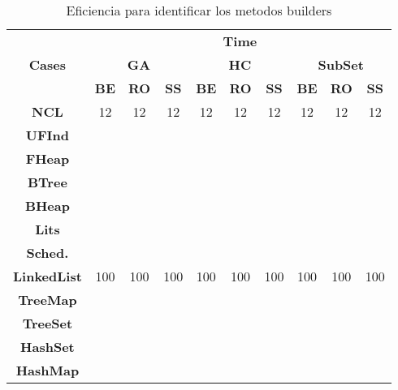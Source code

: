 \begin{table}[t]
\centering
\label{tab:t1}
\scriptsize
\begin{tabular}{|c c|ccc|ccc|ccc|}
\midrule
\multicolumn{2}{|c|}{\multirow{3}{*}{\textbf{Cases}}} & \multicolumn{9}{c|}{\textbf{Time}} \\
\cline{3-11}
\multicolumn{2}{|c|}{} & \multicolumn{3}{c}{\textbf{GA}} & \multicolumn{3}{c}{\textbf{HC}} & \multicolumn{3}{c|}{\textbf{SubSet}} \\
\multicolumn{2}{|c|}{} & \textbf{\tiny{BE}} & \textbf{\tiny{RO}} & \textbf{\tiny{SS}} & \textbf{\tiny{BE}} & \textbf{\tiny{RO}} & \textbf{\tiny{SS}} & \textbf{\tiny{BE}} & \textbf{\tiny{RO}} & \textbf{\tiny{SS}}\\
\midrule
\multicolumn{2}{|c|}{\textbf{NCL}} & 12  & 12  & 12 &  12 &12 &  12&   12& 12  &  12 \\
\midrule
\multicolumn{2}{|c|}{\textbf{UFInd}}&   &   &   &   &   &   &   &   &   \\
\midrule

\multicolumn{2}{|c|}{\textbf{FHeap}} &   &   &   &   &   &   &   &   &   \\
\midrule

\multicolumn{2}{|c|}{\textbf{BTree}} &   &   &   &   &   &   &   &   &   \\
\midrule

\multicolumn{2}{|c|}{\textbf{BHeap}} &   &   &   &   &   &   &   &   &   \\
\midrule

\multicolumn{2}{|c|}{\textbf{Lits}} &   &   &   &   &   &   &   &   &   \\
\midrule

\multicolumn{2}{|c|}{\textbf{Sched.}} &   &   &   &   &   &   &   &   &   \\

\midrule
\multicolumn{2}{|c|}{\textbf{LinkedList}} & 100  & 100  & 100  & 100  &100   &  100 &   100& 100  &100   \\
\midrule

\multicolumn{2}{|c|}{\textbf{TreeMap}} &   &   &   &   &   &   &   &   &   \\
\midrule

\multicolumn{2}{|c|}{\textbf{TreeSet}} &   &   &   &   &   &   &   &   &   \\
\midrule

\multicolumn{2}{|c|}{\textbf{HashSet}} &   &   &   &   &   &   &   &   &   \\
\midrule

\multicolumn{2}{|c|}{\textbf{HashMap}} &   &   &   &   &   &   &   &   &   \\
\hline
\end{tabular}
\caption{Eficiencia para identificar los metodos builders}
\end{table}
